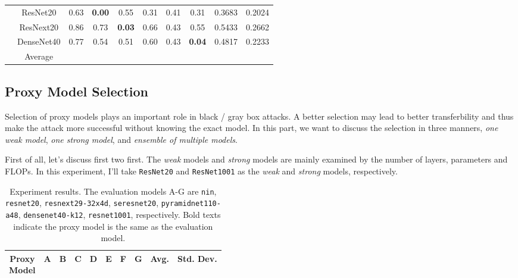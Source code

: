 \documentclass{article}
\begin{document}
\begin{table}
\begin{tabular}{cccccccccc}
                          & ResNet20    & 0.63 & \textbf{0.00} & 0.55 & 0.31 & 0.41 & 0.31 & 0.3683 & 0.2024 \\
                          & ResNext20   & 0.86 & 0.73 & \textbf{0.03} & 0.66 & 0.43 & 0.55 & 0.5433 & 0.2662 \\
                          & DenseNet40  & 0.77 & 0.54 & 0.51 & 0.60 & 0.43 & \textbf{0.04} & 0.4817 & 0.2233 \\
                          & Average     & \\
    \bottomrule
  \end{tabular}
\end{table}

\subsection{Proxy Model Selection}
Selection of proxy models plays an important role in black / gray box attacks. A better selection may lead to better transferbility and thus make the attack more successful without knowing the exact model. In this part, we want to discuss the selection in three manners, \textit{one weak model}, \textit{one strong model}, and \textit{ensemble of multiple models}.

First of all, let's discuss first two first. The \textit{weak} models and \textit{strong} models are mainly examined by the number of layers, parameters and FLOPs. In this experiment, I'll take \texttt{ResNet20} and \texttt{ResNet1001} as the \textit{weak} and \textit{strong} models, respectively.

\begin{table}
  \label{proxy-experiments}
  \centering
  \caption{Experiment results. The evaluation models A-G are \texttt{nin}, \texttt{resnet20}, \texttt{resnext29-32x4d}, \texttt{seresnet20}, \texttt{pyramidnet110-a48}, \texttt{densenet40-k12}, \texttt{resnet1001}, respectively. Bold texts indicate the proxy model is the same as the evaluation model.}
  \begin{tabular}{cccccccccc}
    \toprule
    \makecell{Proxy \\ Model} & A & B & C & D & E & F & G & Avg. & Std. Dev. \\

    \bottomrule
  \end{tabular}
\end{table}
\end{document}
